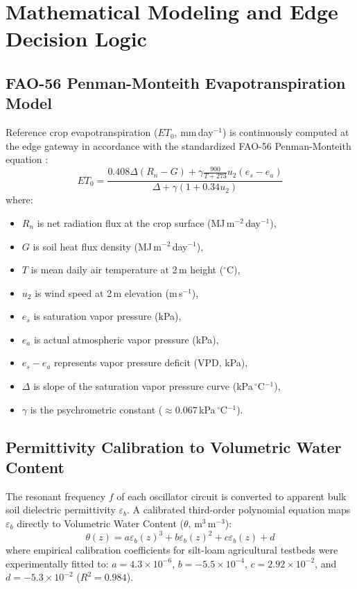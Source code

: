 \documentclass[journal,10pt,twocolumn]{IEEEtran}
\begin{document}
\section{Mathematical Modeling and Edge Decision Logic}
\subsection{FAO-56 Penman-Monteith Evapotranspiration Model}
Reference crop evapotranspiration ($ET_0$, mm\,day$^{-1}$) is continuously computed at the edge gateway in accordance with the standardized FAO-56 Penman-Monteith equation \cite{allen1998crop}:
\begin{equation}
ET_0 = \frac{0.408 \Delta (R_n - G) + \gamma \frac{900}{T + 273} u_2 (e_s - e_a)}{\Delta + \gamma (1 + 0.34 u_2)}
\label{eq:fao56}
\end{equation}
where:
\begin{itemize}
    \item $R_n$ is net radiation flux at the crop surface (MJ\,m$^{-2}$\,day$^{-1}$),
    \item $G$ is soil heat flux density (MJ\,m$^{-2}$\,day$^{-1}$),
    \item $T$ is mean daily air temperature at 2\,m height ($^\circ$C),
    \item $u_2$ is wind speed at 2\,m elevation (m\,s$^{-1}$),
    \item $e_s$ is saturation vapor pressure (kPa),
    \item $e_a$ is actual atmospheric vapor pressure (kPa),
    \item $e_s - e_a$ represents vapor pressure deficit (VPD, kPa),
    \item $\Delta$ is slope of the saturation vapor pressure curve (kPa\,$^\circ$C$^{-1}$),
    \item $\gamma$ is the psychrometric constant ($\approx 0.067$\,kPa\,$^\circ$C$^{-1}$).
\end{itemize}

\subsection{Permittivity Calibration to Volumetric Water Content}
The resonant frequency $f$ of each oscillator circuit is converted to apparent bulk soil dielectric permittivity $\varepsilon_b$. A calibrated third-order polynomial equation maps $\varepsilon_b$ directly to Volumetric Water Content ($\theta$, m$^3$\,m$^{-3}$):
\begin{equation}
\theta(z) = a \varepsilon_b(z)^3 + b \varepsilon_b(z)^2 + c \varepsilon_b(z) + d
\label{eq:vwc_poly}
\end{equation}
where empirical calibration coefficients for silt-loam agricultural testbeds were experimentally fitted to: $a = 4.3 \times 10^{-6}$, $b = -5.5 \times 10^{-4}$, $c = 2.92 \times 10^{-2}$, and $d = -5.3 \times 10^{-2}$ ($R^2 = 0.984$).
\end{document}
